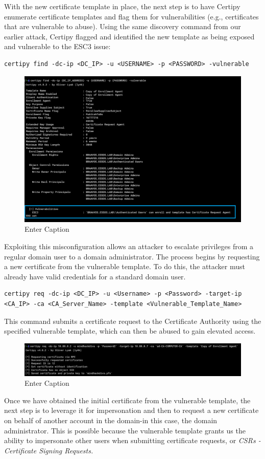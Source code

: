 With the new certificate template in place, the next step is to have Certipy enumerate certificate templates and flag them for vulnerabilities (e.g., certificates that are vulnerable to abuse). Using the same discovery command from our earlier attack, Certipy flagged and identified the new template as being exposed and vulnerable to the ESC3 issue:
\begin{notebox}
\begin{verbatim}
certipy find -dc-ip <DC_IP> -u <USERNAME> -p <PASSWORD> -vulnerable
\end{verbatim}
\end{notebox}
\begin{figure}
    \centering
    \includegraphics[width=0.75\linewidth]{certipy7.png}
    \caption{Enter Caption}
    \label{fig:placeholder}
\end{figure}
Exploiting this misconfiguration allows an attacker to escalate privileges from a regular domain user to a domain administrator. The process begins by requesting a new certificate from the vulnerable template. To do this, the attacker must already have valid credentials for a standard domain user.
\begin{notebox}
\begin{verbatim}
certipy req -dc-ip <DC_IP> -u <Username> -p <Password> -target-ip <CA_IP> -ca <CA_Server_Name> -template <Vulnerable_Template_Name>
\end{verbatim}
\end{notebox}
This command submits a certificate request to the Certificate Authority using the specified vulnerable template, which can then be abused to gain elevated access.
\begin{figure}
    \centering
    \includegraphics[width=0.75\linewidth]{certipy8.png}
    \caption{Enter Caption}
    \label{fig:placeholder}
\end{figure}
Once we have obtained the initial certificate from the vulnerable template, the next step is to leverage it for impersonation and then to request a new certificate on behalf of another account in the domain-in this case, the domain administrator. This is possible because the vulnerable template grants us the ability to impersonate other users when submitting certificate requests, or \textit{CSRs - Certificate Signing Requests.}

